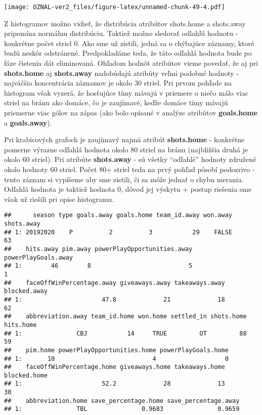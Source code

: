 \documentclass[
]{article}
\newenvironment{Shaded}{\begin{snugshade}}{\end{snugshade}}
\newcommand{\DecValTok}[1]{\textcolor[rgb]{0.00,0.00,0.81}{#1}}
\newcommand{\FunctionTok}[1]{\textcolor[rgb]{0.00,0.00,0.00}{#1}}
\newcommand{\NormalTok}[1]{#1}
\newcommand{\SpecialCharTok}[1]{\textcolor[rgb]{0.00,0.00,0.00}{#1}}
\begin{document}
\texttt{[image: OZNAL-ver2\_files/figure-latex/unnamed-chunk-49-4.pdf]}

Z histogramov možno vidieť, že distribúcia atribútov shots.home a
shots.away pripomína normálnu distribúciu. Taktiež možno sledovať
odlahľú hodnotu - konkrétne počet striel 0. Ako sme už zistili, jedná sa
o chýbajúce záznamy, ktoré budú neskôr odstránené. Predpokladáme teda,
že táto odľahlá hodnota bude po fáze čistenia dát eliminovaná. Ohľadom
hodnôt atribútov vieme povedať, že aj pri \textbf{shots.home} aj
\textbf{shots.away} nadobúdajú atribúty veľmi podobné hodnoty -
najväčšia koncentrácia záznamov je okolo 30 striel. Pri prvom pohľade na
histogram však vyzerá, že hosťujúce tímy mávajú v priemere o niečo málo
viac striel na bránu ako domáce, čo je zaujímavé, keďže domáce tímy
mávajú priemerne viac gólov na zápas (ako bolo opísané v analýze
atribútov \textbf{goals.home} a \textbf{goals.away}).

Pri krabicových grafoch je zaujímavý najmä atribút \textbf{shots.home} -
konkrétne pomerne výrazne odľahlá hodnota okolo 80 striel na bránu
(najbližšia druhá je okolo 60 striel). Pri atribúte \textbf{shots.away}
- sú všetky ``odľahlé'' hodnoty združené okolo hodnoty 60 striel. Počet
80+ striel teda na prvý pohľad pôsobí podozrivo - tento záznam si
vypíšeme aby sme zistili, či sa môže jednať o chybu merania. Odľahlá
hodnota je taktiež hodnota 0, dôvod jej výskytu + postup riešenia sme
však už riešili pri opise histogramu.

\begin{Shaded}
\end{Shaded}

\begin{verbatim}
##      season type goals.away goals.home team_id.away won.away shots.away
## 1: 20192020    P          2          3           29    FALSE         63
##    hits.away pim.away powerPlayOpportunities.away powerPlayGoals.away
## 1:        46        8                           5                   1
##    faceOffWinPercentage.away giveaways.away takeaways.away blocked.away
## 1:                      47.8             21             18           62
##    abbreviation.away team_id.home won.home settled_in shots.home hits.home
## 1:               CBJ           14     TRUE         OT         88        59
##    pim.home powerPlayOpportunities.home powerPlayGoals.home
## 1:       10                           4                   0
##    faceOffWinPercentage.home giveaways.home takeaways.home blocked.home
## 1:                      52.2             28             13           30
##    abbreviation.home save_percentage.home save_percentage.away
## 1:               TBL               0.9683               0.9659
\end{verbatim}
\end{document}

